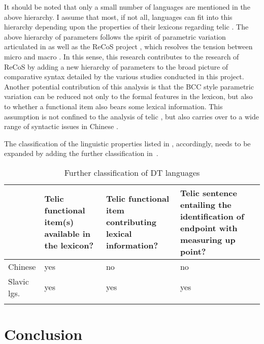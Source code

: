 \documentclass[output=paper]{langsci/langscibook}
\begin{document}
It should be noted that only a small number of languages are mentioned in the
above hierarchy. I assume that most, if not all, languages can fit into this
hierarchy depending upon the properties of their
lexicons regarding telic . The above hierarchy of
parameters follows the spirit of parametric variation articulated in
\textcite{RobHol2010} as well as the ReCoS project \citep{robertsonline}, which
resolves the tension between micro and macro . In this sense, this
research contributes to the research of ReCoS by adding a new hierarchy of
parameters to the broad picture of comparative syntax
detailed by the various studies conducted in this project.  Another potential
contribution of this analysis is that the
\gls{BCC} style parametric variation can be
reduced not only to the formal features in the lexicon, but also to whether a
functional item also bears some lexical information. This assumption is not
confined to the analysis of telic , but also carries over to a wide
range of syntactic issues in Chinese \citep[cf.][Ch.\
4]{huang2015syntactic,hu2018encoding}.


The classification of the linguistic properties listed in , accordingly,
needs to be expanded by adding the further classification in~\Cref{table:2}.\largerpage[2]

\begin{table}
{\small
\caption{Further classification of DT languages\label{table:2}}
\begin{tabularx}{\textwidth}{lQQQ}
\lsptoprule
& Telic functional item(s) available in the lexicon? & Telic functional item contributing lexical information? & Telic sentence entailing the identification of endpoint with measuring up point? \\
\midrule
Chinese & yes & no & no \\
Slavic lgs. & yes & yes & yes\\
\lspbottomrule
\end{tabularx}}
\end{table}

\section{Conclusion}\label{sec:17.6}
\end{document}
